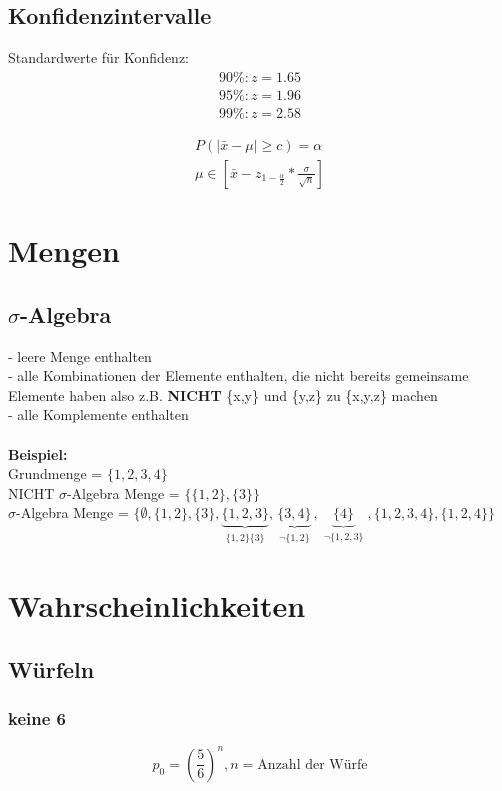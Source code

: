 \documentclass{article}
\begin{document}
	\subsection{Konfidenzintervalle}
	Standardwerte für Konfidenz:
	\begin{align*}
	90\%:z = 1.65\\
	95\%:z = 1.96\\
	99\%:z = 2.58
	\end{align*}
	
	\begin{align}
	P(|\bar{x}-\mu| \geq c) = \alpha \\
	\mu \in [\bar{x} - z_{1-\frac{\alpha}{2}} * \frac{\sigma}{\sqrt{n}}]
	\end{align}
	
	\section{Mengen}
	\subsection{$\sigma$-Algebra}
	- leere Menge enthalten\\
	- alle Kombinationen der Elemente enthalten, die nicht bereits gemeinsame Elemente haben also z.B. \textbf{NICHT} \{x,y\} und \{y,z\} zu \{x,y,z\} machen\\
	- alle Komplemente enthalten\\ \\
	\textbf{Beispiel:}\\
	Grundmenge = $\{1,2,3,4\}$\\
	NICHT $\sigma$-Algebra Menge = $\{\{1,2\},\{3\}\}$\\
	$\sigma$-Algebra Menge = $\{\emptyset ,\{1,2\},\{3\},
	\underbrace{\{1,2,3\}}_{\substack{\{1,2\}\{3\}}},
	\underbrace{\{3,4\}}_{\substack{\neg \{1,2\}}},
	\underbrace{\{4\}}_{\substack{\neg \{1,2,3\}}},
	\{1,2,3,4\},\{1,2,4\}\}$
	
	\section{Wahrscheinlichkeiten}
	\subsection{Würfeln}
	\subsubsection{keine 6}
	\[
	p_0 = \left( \frac{5}{6} \right)^n , n = \text{Anzahl der Würfe}
	\]
\end{document}
